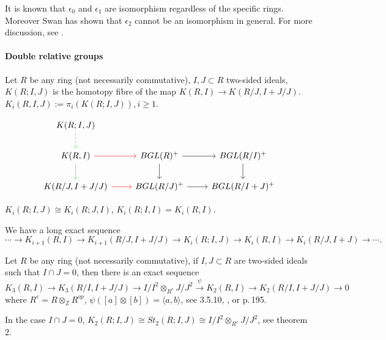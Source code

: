 \begin{remark}
	It is known that $\epsilon_0$ and $\epsilon_1$ are isomorphism regardless of the specific rings. Moreover  Swan \cite{SWAN1971221} has shown  that  $\epsilon_2$  cannot be an isomorphism in general. For more discussion, see \cite{STEIN1980213}.
\end{remark}
\paragraph{Double relative groups} %
\label{par:double_relative_groups}



\begin{definition}
	Let $R$ be any ring (not necessarily commutative), $I,J\subset R$ two-sided ideals, $K(R;I,J)$ is the homotopy fibre of the map $K(R,I)\longrightarrow K(R/J,I+J/J)$. $K_i(R,I,J):=\pi_i(K(R;I,J)), i\geq 1$.
\end{definition}
\[
\begin{tikzcd}
	K(R;I,J) \ar[d, green, dashed] & & \\
	K(R,I) \ar[r,red] \ar[d, green] & BGL(R)^+ \ar[r] \ar[d] &BGL(R/I)^+ \ar[d] \\
	K(R/J,I+J/J) \ar[r,red]  & BGL(R/J)^+ \ar[r]  &BGL(R/I+J)^+ 
\end{tikzcd}\]
\begin{remark}
	$K_i(R;I,J)\cong K_i(R;J,I)$, $K_i(R;I,I)=K_i(R,I)$.
\end{remark}
We have a long exact sequence 
\[\cdots \longrightarrow K_{i+1}(R,I)\longrightarrow K_{i+1}(R/J,I+J/J) \longrightarrow K_i(R;I,J)\longrightarrow K_i(R,I)\longrightarrow K_i(R/J,I+J)\longrightarrow \cdots.\]



Let $R$ be any ring (not necessarily commutative), if $I,J\subset R$ are two-sided ideals such that $I\cap J =0$, then there is an exact sequence
\[K_3(R,I) \longrightarrow K_3(R/I,I+J/J)\longrightarrow I/I^2\otimes_{R^e}J/J^2\overset{\psi}{\longrightarrow}K_2(R,I)\longrightarrow K_2(R/I,I+J/J)\longrightarrow 0\]
where $R^e= R\otimes_{\mathbb{Z}}R^{op}$, $\psi([a]\otimes [b])=\langle a, b\rangle$, see \cite{weibel2013k} 3.5.10, \cite{STEIN1980213}, \cite{Keune1978The} or \cite{friedlander1981algebraic} p.\,195.

In the case $I\cap J =0$, $K_2(R;I,J)\cong St_2(R;I,J)\cong I/I^2\otimes_{R^e}J/J^2$, see \cite{Guin-Waléry1981} theorem 2.


